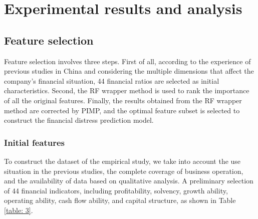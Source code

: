 \documentclass[review]{elsarticle}
\begin{document}
\section{Experimental results and analysis}
\label{section_5}
\subsection{Feature selection}
Feature selection involves three steps. First of all, according to the experience of previous studies in China \citep{Chen2013, Sun2020, Zhu2019} and considering the multiple dimensions that affect the company's financial situation, 44 financial ratios are selected as initial characteristics. Second, the RF wrapper method is used to rank the importance of all the original features. Finally, the results obtained from the RF wrapper method are corrected by PIMP, and the optimal feature subset is selected to construct the financial distress prediction model.

\subsubsection{Initial features}
To construct the dataset of the empirical study, we take into account the use situation in the previous studies, the complete coverage of business operation, and the availability of data based on qualitative analysis. A preliminary selection of 44 financial indicators, including profitability, solvency, growth ability, operating ability, cash flow ability, and capital structure, as shown in Table \ref{table: 3}.
\end{document}
